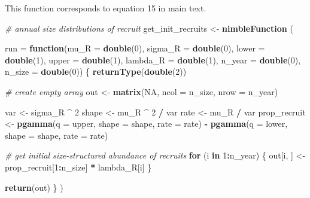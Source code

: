 \documentclass[
]{article}
\newenvironment{Shaded}{\begin{snugshade}}{\end{snugshade}}
\newcommand{\AttributeTok}[1]{\textcolor[rgb]{0.13,0.29,0.53}{#1}}
\newcommand{\CommentTok}[1]{\textcolor[rgb]{0.56,0.35,0.01}{\textit{#1}}}
\newcommand{\ConstantTok}[1]{\textcolor[rgb]{0.56,0.35,0.01}{#1}}
\newcommand{\ControlFlowTok}[1]{\textcolor[rgb]{0.13,0.29,0.53}{\textbf{#1}}}
\newcommand{\DecValTok}[1]{\textcolor[rgb]{0.00,0.00,0.81}{#1}}
\newcommand{\FunctionTok}[1]{\textcolor[rgb]{0.13,0.29,0.53}{\textbf{#1}}}
\newcommand{\NormalTok}[1]{#1}
\newcommand{\OtherTok}[1]{\textcolor[rgb]{0.56,0.35,0.01}{#1}}
\newcommand{\SpecialCharTok}[1]{\textcolor[rgb]{0.81,0.36,0.00}{\textbf{#1}}}
\begin{document}
This function corresponds to equation 15 in main text.

\begin{Shaded}
\begin{Highlighting}[]
\CommentTok{\# annual size distributions of recruit}
\NormalTok{get\_init\_recruits }\OtherTok{\textless{}{-}} \FunctionTok{nimbleFunction}\NormalTok{ (}
    
  \AttributeTok{run =} \ControlFlowTok{function}\NormalTok{(}\AttributeTok{mu\_R =} \FunctionTok{double}\NormalTok{(}\DecValTok{0}\NormalTok{), }\AttributeTok{sigma\_R =} \FunctionTok{double}\NormalTok{(}\DecValTok{0}\NormalTok{),}
                 \AttributeTok{lower =} \FunctionTok{double}\NormalTok{(}\DecValTok{1}\NormalTok{), }\AttributeTok{upper =} \FunctionTok{double}\NormalTok{(}\DecValTok{1}\NormalTok{),}
                 \AttributeTok{lambda\_R =} \FunctionTok{double}\NormalTok{(}\DecValTok{1}\NormalTok{), }\AttributeTok{n\_year =} \FunctionTok{double}\NormalTok{(}\DecValTok{0}\NormalTok{),}
                 \AttributeTok{n\_size =} \FunctionTok{double}\NormalTok{(}\DecValTok{0}\NormalTok{))}
\NormalTok{  \{}
    \FunctionTok{returnType}\NormalTok{(}\FunctionTok{double}\NormalTok{(}\DecValTok{2}\NormalTok{))}
    
    \CommentTok{\# create empty array}
\NormalTok{    out }\OtherTok{\textless{}{-}} \FunctionTok{matrix}\NormalTok{(}\ConstantTok{NA}\NormalTok{, }\AttributeTok{ncol =}\NormalTok{ n\_size, }\AttributeTok{nrow =}\NormalTok{ n\_year)}

\NormalTok{    var }\OtherTok{\textless{}{-}}\NormalTok{ sigma\_R }\SpecialCharTok{\^{}} \DecValTok{2}
\NormalTok{    shape }\OtherTok{\textless{}{-}}\NormalTok{ mu\_R }\SpecialCharTok{\^{}} \DecValTok{2} \SpecialCharTok{/}\NormalTok{ var}
\NormalTok{    rate }\OtherTok{\textless{}{-}}\NormalTok{ mu\_R }\SpecialCharTok{/}\NormalTok{ var}
\NormalTok{    prop\_recruit }\OtherTok{\textless{}{-}} \FunctionTok{pgamma}\NormalTok{(}\AttributeTok{q =}\NormalTok{ upper, }\AttributeTok{shape =}\NormalTok{ shape, }\AttributeTok{rate =}\NormalTok{ rate) }\SpecialCharTok{{-}}
      \FunctionTok{pgamma}\NormalTok{(}\AttributeTok{q =}\NormalTok{ lower, }\AttributeTok{shape =}\NormalTok{ shape, }\AttributeTok{rate =}\NormalTok{ rate)}
      
    \CommentTok{\# get initial size{-}structured abundance of recruits}
    \ControlFlowTok{for}\NormalTok{ (i }\ControlFlowTok{in} \DecValTok{1}\SpecialCharTok{:}\NormalTok{n\_year) \{}
\NormalTok{      out[i, ] }\OtherTok{\textless{}{-}}\NormalTok{ prop\_recruit[}\DecValTok{1}\SpecialCharTok{:}\NormalTok{n\_size] }\SpecialCharTok{*}\NormalTok{ lambda\_R[i]}
\NormalTok{    \}}

    \FunctionTok{return}\NormalTok{(out)}
\NormalTok{  \}}
\NormalTok{)}
\end{Highlighting}
\end{Shaded}
\end{document}
